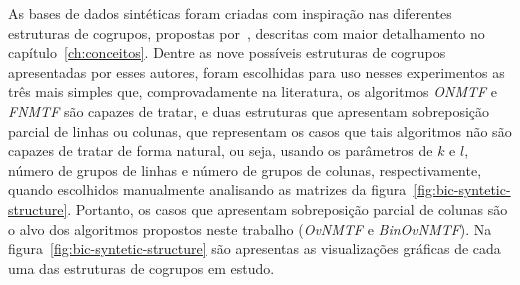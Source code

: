 \documentclass[
    12pt,                %
    oneside,            %
    a4paper,            %
    english,            %
    brazil                %
    ]{abntex2ppgsi}
\begin{document}


As bases de dados sintéticas foram criadas com inspiração nas diferentes estruturas de cogrupos, propostas por~, descritas com maior detalhamento no capítulo~\ref{ch:conceitos}.
Dentre as nove possíveis estruturas de cogrupos apresentadas por esses autores, foram escolhidas para uso nesses experimentos as três mais simples que, comprovadamente na literatura, os algoritmos \textit{ONMTF} e \textit{FNMTF} são capazes de tratar, e duas estruturas que apresentam sobreposição parcial de linhas ou colunas, que representam os casos que tais algoritmos não são capazes de tratar de forma natural, ou seja, usando os parâmetros de $k$ e $l$, número de grupos de linhas e número de grupos de colunas, respectivamente, quando escolhidos manualmente analisando as matrizes da figura~\ref{fig:bic-syntetic-structure}.
Portanto, os casos que apresentam sobreposição parcial de colunas são o alvo dos algoritmos propostos neste trabalho (\textit{OvNMTF} e \textit{BinOvNMTF}).
Na figura~\ref{fig:bic-syntetic-structure} são apresentas as visualizações gráficas de cada uma das estruturas de cogrupos em estudo.
\end{document}
